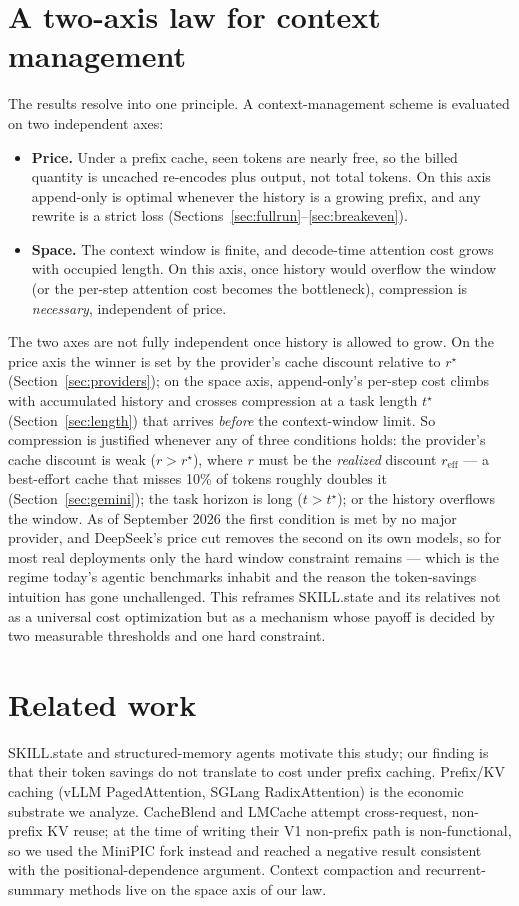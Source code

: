 \documentclass[11pt]{article}
\begin{document}
\section{A two-axis law for context management}
\label{sec:law}
The results resolve into one principle. A context-management scheme is evaluated
on two independent axes:
\begin{itemize}[leftmargin=*,itemsep=1pt]
\item \textbf{Price.} Under a prefix cache, seen tokens are nearly free, so the
billed quantity is uncached re-encodes plus output, not total tokens. On this
axis append-only is optimal whenever the history is a growing prefix, and any
rewrite is a strict loss (Sections~\ref{sec:fullrun}--\ref{sec:breakeven}).
\item \textbf{Space.} The context window is finite, and decode-time attention
cost grows with occupied length. On this axis, once history would overflow the
window (or the per-step attention cost becomes the bottleneck), compression is
\emph{necessary}, independent of price.
\end{itemize}
The two axes are not fully independent once history is allowed to grow. On the
price axis the winner is set by the provider's cache discount relative to
$r^\star$ (Section~\ref{sec:providers}); on the space axis, append-only's
per-step cost climbs with accumulated history and crosses compression at a task
length $t^\star$ (Section~\ref{sec:length}) that arrives \emph{before} the
context-window limit. So compression is justified whenever any of three
conditions holds: the provider's cache discount is weak ($r>r^\star$), where
$r$ must be the \emph{realized} discount $r_{\text{eff}}$ --- a best-effort
cache that misses 10\% of tokens roughly doubles it (Section~\ref{sec:gemini});
the task horizon is long ($t>t^\star$); or the history overflows the window. As of
September 2026 the first condition is met by no major provider, and DeepSeek's
price cut removes the second on its own models, so for most real deployments only
the hard window constraint remains --- which is the regime today's agentic
benchmarks inhabit and the reason the token-savings intuition has gone
unchallenged. This reframes SKILL.state and its relatives not as a universal
cost optimization but as a mechanism whose payoff is decided by two measurable
thresholds and one hard constraint.

\section{Related work}
SKILL.state and structured-memory agents motivate this study; our finding is that
their token savings do not translate to cost under prefix caching. Prefix/KV
caching (vLLM PagedAttention, SGLang RadixAttention) is the economic substrate we
analyze. CacheBlend and LMCache attempt cross-request, non-prefix KV reuse; at
the time of writing their V1 non-prefix path is non-functional, so we used the
MiniPIC fork instead and reached a negative result consistent with the
positional-dependence argument. Context compaction and recurrent-summary methods
live on the space axis of our law.
\end{document}
